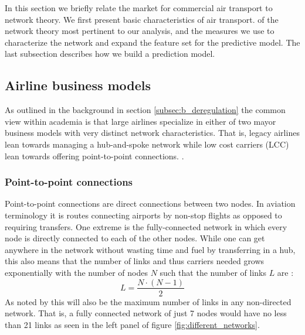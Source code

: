 \label{sec:theory}
In this section we briefly relate the market for commercial air transport to network theory. We first present basic characteristics of air transport.  of the network theory most pertinent to our analysis, and the measures we use to characterize the network and expand the feature set for the predictive model. The last subsection describes how we build a prediction model. 

\subsection{Airline business models}
As outlined in the background in section \ref{subsec:b_deregulation} the common view within academia is that large airlines specialize in either of two mayor business models with very distinct network characteristics. That is, legacy airlines lean towards managing a hub-and-spoke network while low cost carriers (LCC) lean towards offering point-to-point connections. \citep{daraban2012low,baker2013service,marti2015efficiency}.

\subsubsection{Point-to-point connections}
Point-to-point connections are direct connections between two nodes. In aviation terminology it is routes connecting airports by non-stop flights as opposed to requiring transfers. One extreme is the fully-connected network in which every node is directly connected to each of the other nodes. While one can get anywhere in the network without wasting time and fuel by transferring in a hub, this also means that the number of links and thus carriers needed grows exponentially with the number of nodes $N$ such that the number of links $L$ are \citep{bryan1999hub}:
\begin{equation}
  L=\frac{N\cdot(N-1)}{2}
  \label{eq:max_links}
\end{equation}
As noted by \citet{barabasi2016networks} this will also be the maximum number of links in any non-directed network. That is, a fully connected network of just 7 nodes would have no less than 21 links as seen in the left panel of figure \ref{fig:different_networks}.

